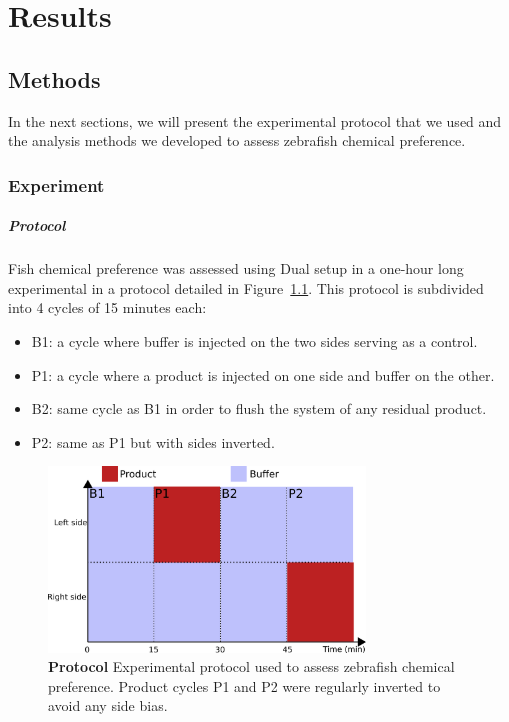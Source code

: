 \chapter{Results}
  \section{Methods}
  In the next sections, we will present the experimental protocol that we used and the analysis methods we developed to assess zebrafish chemical preference.

  \subsection{Experiment}
  \paragraph{Protocol} Fish chemical preference was assessed using Dual setup in a one-hour long experimental in a protocol detailed in Figure~\ref{exp_protocol}. This protocol is subdivided into 4 cycles of 15 minutes each:
\begin{itemize}
  \item B1: a cycle where buffer is injected on the two sides serving as a control.
  \item P1: a cycle where a product is injected on one side and buffer on the other.
  \item B2: same cycle as B1 in order to flush the system of any residual product.
  \item P2: same as P1 but with sides inverted.
\end{itemize}

    \begin{figure}[htb]
      \centering
      \includegraphics[width=0.75\textwidth]{part_2/assets/protocol.png}
      \caption{\textbf{Protocol} Experimental protocol used to assess zebrafish chemical preference. Product cycles P1 and P2 were regularly inverted to avoid any side bias.}
      \label{exp_protocol}
    \end{figure}

